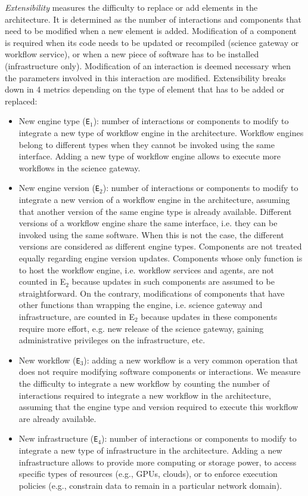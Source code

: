 \documentclass[preprint,3p,twocolumn]{elsarticle}
\newcommand{\todo}[2]{\pdfmargincomment[color=red,author=#1,open=true]{#2}}
\begin{document}
\emph{Extensibility} measures the difficulty to replace or add
elements in the architecture. It is determined as the number of interactions and
components that need to be modified when a new element is
added. Modification of a component is required when its code needs to
be updated or recompiled (science gateway or workflow service), or
when a new piece of software has to be installed (infrastructure
only). Modification of an interaction is deemed necessary when the
parameters involved in this interaction are modified.  Extensibility
breaks down in 4 metrics depending on the type of element that has to
be added or replaced:
\begin{itemize}[leftmargin=0cm,itemindent=0.35cm,itemsep=0cm]
\item New engine type (\texttt{E$_1$}): number of interactions or
  components to modify to integrate a new type of workflow engine in
  the architecture. Workflow engines belong to different types when
  they cannot be invoked using the same interface. Adding a new type
  of workflow engine allows to execute more workflows in the science
  gateway.
\item New engine version (\texttt{E$_2$}): number of interactions or
  components to modify to integrate a new version of a workflow engine
  in the architecture, assuming that another version of the same
  engine type is already available. Different versions of a workflow
  engine share the same interface, i.e. they can be invoked using the
  same software. When this is not the case, the different versions are
  considered as different engine types. Components are not treated
  equally regarding engine version updates. Components whose only
  function is to host the workflow engine, i.e. workflow services and
  agents, are not counted in E$_2$ because updates in such components
  are assumed to be straightforward. On the contrary, modifications of
  components that have other functions than wrapping the engine,
  i.e. science gateway and infrastructure, are counted in E$_2$
  because updates in these components require more effort, e.g. new
  release of the science gateway, gaining administrative privileges on
  the infrastructure, etc.
\item New workflow (\texttt{E$_3$}): adding a new workflow is a very
  common operation that does not require modifying software components
  or interactions. We measure the difficulty to integrate a new
  workflow by counting the number of interactions required
  to integrate a new workflow in the architecture, assuming
  that the engine type and version required to execute this workflow
  are already available.
\item New infrastructure (\texttt{E$_4$}): number of interactions or
  components to modify to integrate a new type of infrastructure in
  the architecture. Adding a new infrastructure allows to provide more
  computing or storage power, to access specific types of resources
  (e.g., GPUs, clouds), or to enforce execution policies (e.g.,
  constrain data to remain in a particular network domain).
\end{itemize}
\end{document}
